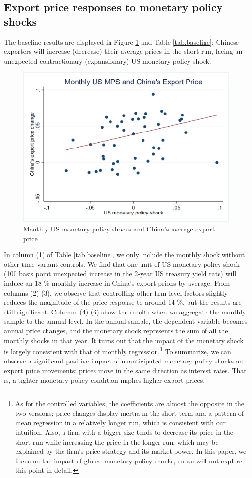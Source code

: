 \subsection{Export price responses to monetary policy shocks}

The baseline results are displayed in Figure \ref{fig.US_shock} and Table \ref{tab.baseline}: Chinese exporters will increase (decrease) their average prices in the short run, facing an unexpected contractionary (expansionary) US monetary policy shock. 

\begin{figure}[htbp]
    \centering
    \includegraphics[width=0.8\columnwidth]{latex/slides/pic_Dec2023/brw_monthly.png}
    \caption{Monthly US monetary policy shocks and China's average export price}
    \label{fig.US_shock}
\end{figure}

In column (1) of Table \ref{tab.baseline}, we only include the monthly shock without other time-variant controls. We find that one unit of US monetary policy shock (100 basis point unexpected increase in the 2-year US treasury yield rate) will induce an 18 $\%$ monthly increase in China's export prions by average. From columns (2)-(3), we observe that controlling other firm-level factors slightly reduces the magnitude of the price response to around 14 $\%$, but the results are still significant. Columns (4)-(6) show the results when we aggregate the monthly sample to the annual level. In the annual sample, the dependent variable becomes annual price changes, and the monetary shock represents the sum of all the monthly shocks in that year. It turns out that the impact of the monetary shock is largely consistent with that of monthly regression.\footnote{As for the controlled variables, the coefficients are almost the opposite in the two versions; price changes display inertia in the short term and a pattern of mean regression in a relatively longer run, which is consistent with our intuition. Also, a firm with a bigger size tends to decrease its price in the short run while increasing the price in the longer run, which may be explained by the firm's price strategy and its market power. In this paper, we focus on the impact of global monetary policy shocks, so we will not explore this point in detail.} To summarize, we can observe a significant positive impact of unanticipated monetary policy shocks on export price movements: prices move in the same direction as interest rates. That is, a tighter monetary policy condition implies higher export prices.

